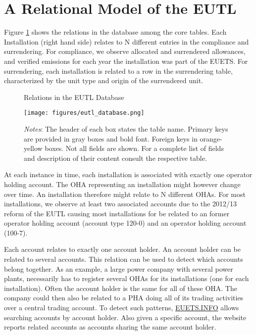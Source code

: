 \documentclass[authoryear]{elsarticle}
\begin{document}




\section{A Relational Model of the EUTL}\label{sec:model}
Figure \ref{fig:eutl_database} shows the relations in the database among the core tables. Each Installation (right hand side) relates to N different entries in the compliance and surrendering. For compliance, we observe allocated and surrendered allowances, and verified emissions for each year the installation was part of the EUETS. For surrendering, each installation is related to a row in the surrendering table, characterized by the unit type and origin of the surrendered unit. 
	
\begin{figure}[!htbp]
	\caption{Relations in the EUTL Database}\label{fig:eutl_database}
	\centering
	\texttt{[image: figures/eutl\_database.png]}
	\vspace{-5ex}
	\caption*{\footnotesize \emph{Notes}: The header of each box states the table name. Primary keys are provided in gray boxes and bold font. Foreign keys in orange-yellow boxes. Not all fields are shown. For a complete list of fields and description of their content consult the respective table.}
	\vspace{0ex}
\end{figure}

At each instance in time, each installation is associated with exactly one operator holding account. The OHA representing an installation might however change over time. An installation therefore might relate to N different OHAs. For most installations, we observe at least two associated accounts due to the 2012/13 reform of the EUTL causing most installations for be related to an former operator holding account (account type 120-0) and an operator holding account (100-7).

Each account relates to exactly one account holder. An account holder can be related to several accounts. This relation can be used to detect which accounts belong together. As an example, a large power company with several power plants, necessarily has to register several OHAs for its installations (one for each installation). Often the account holder is the same for all of these OHA. The company could then also be related to a PHA doing all of its trading activities over a central trading account. To detect such patterns, \href{https://www.euets.info}{EUETS.INFO} allows searching accounts by account holder. Also given a specific account, the website reports related accounts as accounts sharing the same account holder. 
\end{document}
